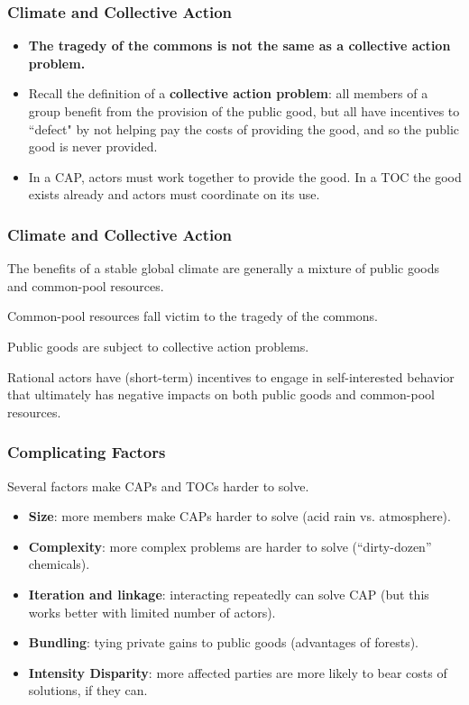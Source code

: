 \documentclass{beamer}
\begin{document}
\begin{frame} 
	\frametitle{\LARGE{Climate and Collective Action}}
	\begin{itemize}
		\item \textbf{The tragedy of the commons is not the same as a collective action problem.} \pause
		\item Recall the definition of a \textbf{collective action problem}: all members of a group benefit from the provision of the public good, but all have incentives to ``defect" by not helping pay the costs of providing the good, and so the public good is never provided. \pause
		\item In a CAP, actors must work together to provide the good. In a TOC the good exists already and actors must coordinate on its use.
	\end{itemize}
\end{frame}



\begin{frame} 
	\frametitle{\LARGE{Climate and Collective Action}}
	\begin{itemize}
		\large{
			\item The benefits of a stable global climate are generally a mixture of public goods and common-pool resources. \pause
			
			\item Common-pool resources fall victim to the tragedy of the commons. \pause
			
			\item Public goods are subject to collective action problems. \pause 
			
			\item Rational actors have (short-term) incentives to engage in self-interested behavior that ultimately has negative impacts on both public goods and common-pool resources.
		}
	\end{itemize}
\end{frame}

\begin{frame} 
	\frametitle{\LARGE{Complicating Factors}}
	Several factors make CAPs and TOCs harder to solve. \pause
	\begin{itemize}
		\item \textbf{Size}: more members make CAPs harder to solve (acid rain vs. atmosphere). \pause
		
		\item \textbf{Complexity}: more complex problems are harder to solve (``dirty-dozen'' chemicals). \pause
		
		\item \textbf{Iteration and linkage}: interacting repeatedly can solve CAP (but this works better with limited number of actors). \pause 
		
		\item \textbf{Bundling}: tying private gains to public goods (advantages of forests). \pause 
		
		\item \textbf{Intensity Disparity}: more affected parties are more likely to bear costs of solutions, if they can.
		
	\end{itemize}
\end{frame}
\end{document}
